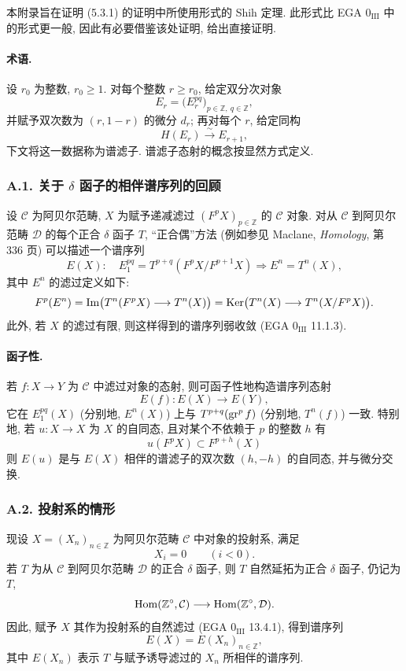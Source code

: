 本附录旨在证明 (5.3.1) 的证明中所使用形式的 Shih 定理. 此形式比 EGA \(0_{\mathrm{III}}\) 中的形式更一般, 因此有必要借鉴该处证明, 给出直接证明.

\paragraph{术语.}
设 \(r_0\) 为整数, \(r_0\ge1\). 对每个整数 \(r\ge r_0\), 给定双分次对象
\[
E_r=\bigl(E_r^{pq}\bigr)_{p\in\mathbb Z,\ q\in\mathbb Z},
\]
并赋予双次数为 \((r,1-r)\) 的微分 \(d_r\); 再对每个 \(r\), 给定同构
\[
H(E_r)\xrightarrow{\sim}E_{r+1},
\]
下文将这一数据称为谱滤子. 谱滤子态射的概念按显然方式定义.

\subsubsection*{A.1. 关于 \(\delta\) 函子的相伴谱序列的回顾}

设 \(\mathcal C\) 为阿贝尔范畴, \(X\) 为赋予递减滤过 \((F^pX)_{p\in\mathbb Z}\) 的 \(\mathcal C\) 对象. 对从 \(\mathcal C\) 到阿贝尔范畴 \(\mathcal D\) 的每个正合 \(\delta\) 函子 \(T\), ``正合偶''方法 (例如参见 Maclane, \emph{Homology}, 第 336 页) 可以描述一个谱序列
\[
E(X):\quad E_1^{pq}=T^{p+q}(F^pX/F^{p+1}X)\Rightarrow E^n=T^n(X),
\]
其中 \(E^n\) 的滤过定义如下:
\[
F^p(E^n)=\operatorname{Im}\bigl(T^n(F^pX)\longrightarrow T^n(X)\bigr)
=\operatorname{Ker}\bigl(T^n(X)\longrightarrow T^n(X/F^pX)\bigr).
\]
此外, 若 \(X\) 的滤过有限, 则这样得到的谱序列弱收敛 (EGA \(0_{\mathrm{III}}\) 11.1.3).

\paragraph{函子性.}
若 \(f:X\to Y\) 为 \(\mathcal C\) 中滤过对象的态射, 则可函子性地构造谱序列态射
\[
E(f):E(X)\longrightarrow E(Y),
\]
它在 \(E_1^{pq}(X)\) (分别地, \(E^n(X)\)) 上与 \(T^{p+q}(\operatorname{gr}^p f)\) (分别地, \(T^n(f)\)) 一致. 特别地, 若 \(u:X\to X\) 为 \(X\) 的自同态, 且对某个不依赖于 \(p\) 的整数 \(h\) 有
\[
u(F^pX)\subset F^{p+h}(X)
\]
则 \(E(u)\) 是与 \(E(X)\) 相伴的谱滤子的双次数 \((h,-h)\) 的自同态, 并与微分交换.

\subsubsection*{A.2. 投射系的情形}
现设 \(X=(X_n)_{n\in\mathbb Z}\) 为阿贝尔范畴 \(\mathcal C\) 中对象的投射系, 满足
\[
X_i=0\qquad(i<0).
\]
若 \(T\) 为从 \(\mathcal C\) 到阿贝尔范畴 \(\mathcal D\) 的正合 \(\delta\) 函子, 则 \(T\) 自然延拓为正合 \(\delta\) 函子, 仍记为 \(T\),
\[
\operatorname{Hom}(\mathbb Z^\circ,\mathcal C)\longrightarrow \operatorname{Hom}(\mathbb Z^\circ,\mathcal D).
\]
因此, 赋予 \(X\) 其作为投射系的自然滤过 (EGA \(0_{\mathrm{III}}\) 13.4.1), 得到谱序列
\[
E(X)=E(X_n)_{n\in\mathbb Z},
\]
其中 \(E(X_n)\) 表示 \(T\) 与赋予诱导滤过的 \(X_n\) 所相伴的谱序列.

